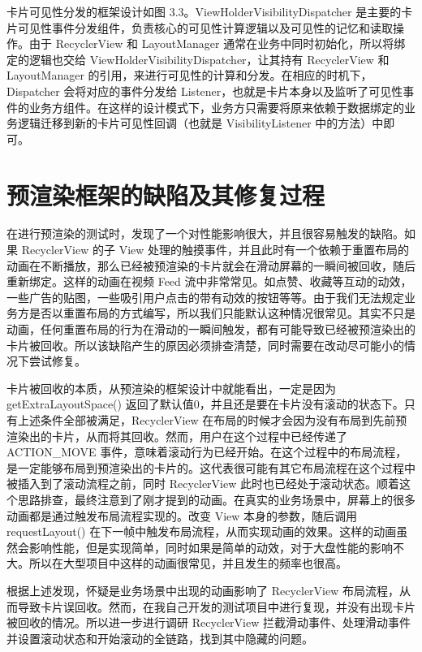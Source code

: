 
卡片可见性分发的框架设计如图 3.3。ViewHolderVisibilityDispatcher 是主要的卡片可见性事件分发组件，负责核心的可见性计算逻辑以及可见性的记忆和读取操作。由于 RecyclerView 和 LayoutManager 通常在业务中同时初始化，所以将绑定的逻辑也交给 ViewHolderVisibilityDispatcher，让其持有 RecyclerView 和 LayoutManager 的引用，来进行可见性的计算和分发。在相应的时机下，Dispatcher 会将对应的事件分发给 Listener，也就是卡片本身以及监听了可见性事件的业务方组件。在这样的设计模式下，业务方只需要将原来依赖于数据绑定的业务逻辑迁移到新的卡片可见性回调（也就是 VisibilityListener 中的方法）中即可。

\section{预渲染框架的缺陷及其修复过程}

在进行预渲染的测试时，发现了一个对性能影响很大，并且很容易触发的缺陷。如果 RecyclerView 的子 View 处理的触摸事件，并且此时有一个依赖于重置布局的动画在不断播放，那么已经被预渲染的卡片就会在滑动屏幕的一瞬间被回收，随后重新绑定。这样的动画在视频 Feed 流中非常常见。如点赞、收藏等互动的动效，一些广告的贴图，一些吸引用户点击的带有动效的按钮等等。由于我们无法规定业务方是否以重置布局的方式编写，所以我们只能默认这种情况很常见。其实不只是动画，任何重置布局的行为在滑动的一瞬间触发，都有可能导致已经被预渲染出的卡片被回收。所以该缺陷产生的原因必须排查清楚，同时需要在改动尽可能小的情况下尝试修复。

卡片被回收的本质，从预渲染的框架设计中就能看出，一定是因为 getExtraLayoutSpace() 返回了默认值0，并且还是要在卡片没有滚动的状态下。只有上述条件全部被满足，RecyclerView 在布局的时候才会因为没有布局到先前预渲染出的卡片，从而将其回收。然而，用户在这个过程中已经传递了 ACTION\_MOVE 事件，意味着滚动行为已经开始。在这个过程中的布局流程，是一定能够布局到预渲染出的卡片的。这代表很可能有其它布局流程在这个过程中被插入到了滚动流程之前，同时 RecyclerView 此时也已经处于滚动状态。顺着这个思路排查，最终注意到了刚才提到的动画。在真实的业务场景中，屏幕上的很多动画都是通过触发布局流程实现的。改变 View 本身的参数，随后调用 requestLayout() 在下一帧中触发布局流程，从而实现动画的效果。这样的动画虽然会影响性能，但是实现简单，同时如果是简单的动效，对于大盘性能的影响不大。所以在大型项目中这样的动画很常见，并且发生的频率也很高。

根据上述发现，怀疑是业务场景中出现的动画影响了 RecyclerView 布局流程，从而导致卡片误回收。然而，在我自己开发的测试项目中进行复现，并没有出现卡片被回收的情况。所以进一步进行调研 RecyclerView 拦截滑动事件、处理滑动事件并设置滚动状态和开始滚动的全链路，找到其中隐藏的问题。


